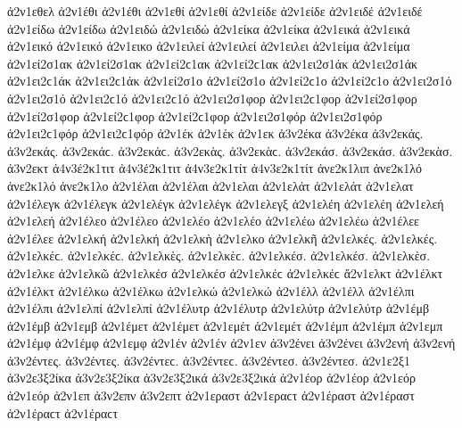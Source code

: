 {ἀ2ν1εθελ 
ἀ2ν1έθι ἀ2ν1έθι   %
ἀ2ν1εθί ἀ2ν1εθί 
ἀ2ν1είδε ἀ2ν1είδε   %
ἀ2ν1ειδέ ἀ2ν1ειδέ 
ἀ2ν1είδω ἀ2ν1είδω   %
ἀ2ν1ειδώ ἀ2ν1ειδώ 
ἀ2ν1είκα ἀ2ν1είκα   %
ἀ2ν1εικά ἀ2ν1εικά 
ἀ2ν1εικό ἀ2ν1εικό   %
ἀ2ν1εικο 
ἀ2ν1ειλεί ἀ2ν1ειλεί   %
ἀ2ν1ειλει 
ἀ2ν1είμα ἀ2ν1είμα   %
ἀ2ν1εί2σ1ακ ἀ2ν1εί2σ1ακ ἀ2ν1εί2ϲ1ακ ἀ2ν1εί2ϲ1ακ   %
ἀ2ν1ει2σ1άκ ἀ2ν1ει2σ1άκ ἀ2ν1ει2ϲ1άκ ἀ2ν1ει2ϲ1άκ 
ἀ2ν1εί2σ1ο ἀ2ν1εί2σ1ο ἀ2ν1εί2ϲ1ο ἀ2ν1εί2ϲ1ο   %
ἀ2ν1ει2σ1ό ἀ2ν1ει2σ1ό ἀ2ν1ει2ϲ1ό ἀ2ν1ει2ϲ1ό 
ἀ2ν1ει2σ1φορ ἀ2ν1ει2ϲ1φορ   %
ἀ2ν1εί2σ1φορ ἀ2ν1εί2σ1φορ ἀ2ν1εί2ϲ1φορ ἀ2ν1εί2ϲ1φορ   %
ἀ2ν1ει2σ1φόρ ἀ2ν1ει2σ1φόρ ἀ2ν1ει2ϲ1φόρ ἀ2ν1ει2ϲ1φόρ 
ἀ2ν1έκ ἀ2ν1έκ   %
ἀ2ν1εκ 
ἀ3ν2έκα ἀ3ν2έκα   %
ἀ3ν2εκάς. ἀ3ν2εκάς. ἀ3ν2εκάϲ. ἀ3ν2εκάϲ.   %
ἀ3ν2εκὰς. ἀ3ν2εκὰϲ. 
ἀ3ν2εκάσ. ἀ3ν2εκάσ. 
ἀ3ν2εκὰσ. 
ἀ3ν2εκτ   %
ἀ4ν3έ2κ1τιτ ἀ4ν3έ2κ1τιτ   %
ἀ4ν3ε2κ1τίτ ἀ4ν3ε2κ1τίτ 
ἀνε2κ1λιπ   %
ἀνε2κ1λό ἀνε2κ1λό   %
ἀνε2κ1λο 
ἀ2ν1έλαι ἀ2ν1έλαι   %
ἀ2ν1ελαι 
ἀ2ν1ελάτ ἀ2ν1ελάτ   %
ἀ2ν1ελατ 
ἀ2ν1έλεγκ ἀ2ν1έλεγκ   %
ἀ2ν1ελέγκ ἀ2ν1ελέγκ 
ἀ2ν1ελεγξ   %
ἀ2ν1ελέη ἀ2ν1ελέη   %
ἀ2ν1ελεή ἀ2ν1ελεή 
ἀ2ν1έλεο ἀ2ν1έλεο   %
ἀ2ν1ελέο ἀ2ν1ελέο 
ἀ2ν1ελέω ἀ2ν1ελέω 
ἀ2ν1έλεε ἀ2ν1έλεε 
ἀ2ν1ελκή ἀ2ν1ελκή   %
ἀ2ν1ελκὴ 
ἀ2ν1ελκο 
ἀ2ν1ελκῆ 
ἀ2ν1ελκές. ἀ2ν1ελκές. ἀ2ν1ελκέϲ. ἀ2ν1ελκέϲ. 
ἀ2ν1ελκὲς. ἀ2ν1ελκὲϲ. 
ἀ2ν1ελκέσ. ἀ2ν1ελκέσ. 
ἀ2ν1ελκὲσ. 
ἀ2ν1ελκε 
ἀ2ν1ελκῶ 
ἀ2ν1ελκέσ ἀ2ν1ελκέσ ἀ2ν1ελκέϲ ἀ2ν1ελκέϲ 
ἄ2ν1ελκτ   %
ἀ2ν1έλκτ ἀ2ν1έλκτ 
ἀ2ν1έλκω ἀ2ν1έλκω   %
ἀ2ν1ελκώ ἀ2ν1ελκώ 
ἀ2ν1έλλ ἀ2ν1έλλ   %
ἀ2ν1έλπι ἀ2ν1έλπι   %
ἀ2ν1ελπί ἀ2ν1ελπί 
ἀ2ν1έλυτρ ἀ2ν1έλυτρ   %
ἀ2ν1ελύτρ ἀ2ν1ελύτρ 
ἀ2ν1έμβ ἀ2ν1έμβ   %
ἀ2ν1εμβ 
ἀ2ν1έμετ ἀ2ν1έμετ   %
ἀ2ν1εμέτ ἀ2ν1εμέτ 
ἀ2ν1έμπ ἀ2ν1έμπ   %
ἀ2ν1εμπ 
ἀ2ν1έμφ ἀ2ν1έμφ   %
ἀ2ν1εμφ 
ἀ2ν1έν ἀ2ν1έν   %
ἀ2ν1εν 
ἀ3ν2ένει ἀ3ν2ένει   %
ἀ3ν2ενή ἀ3ν2ενή   %
ἀ3ν2έντες. ἀ3ν2έντες. ἀ3ν2έντεϲ. ἀ3ν2έντεϲ.   %
ἀ3ν2έντεσ. ἀ3ν2έντεσ. 
ἀ2ν1ε2ξ1   %
ἀ3ν2ε3ξ2ίκα ἀ3ν2ε3ξ2ίκα   %
ἀ3ν2ε3ξ2ικά ἀ3ν2ε3ξ2ικά 
ἀ2ν1έορ ἀ2ν1έορ   %
ἀ2ν1εόρ ἀ2ν1εόρ 
ἀ2ν1επ   %
ἀ3ν2επν   %
ἀ3ν2επτ   %
ἀ2ν1εραστ ἀ2ν1εραϲτ   %
ἀ2ν1έραστ ἀ2ν1έραστ ἀ2ν1έραϲτ ἀ2ν1έραϲτ   %
}
